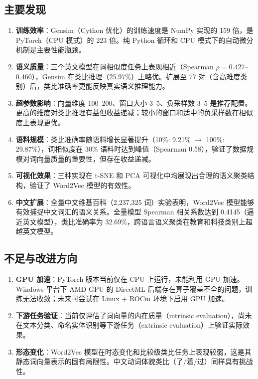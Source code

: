\subsection{主要发现}

\begin{enumerate}
  \item \textbf{训练效率}：Gensim（Cython 优化）的训练速度是 NumPy 实现的 159 倍，是 PyTorch（CPU 模式）的 223 倍。纯 Python 循环和 CPU 模式下的自动微分机制是主要性能瓶颈。
  \item \textbf{语义质量}：三个英文模型在词相似度任务上表现相近（Spearman $\rho = 0.427$--$0.460$），Gensim 在类比推理（25.97\%）上略优。扩展至 77 对（含高难度类别）后，类比准确率更能反映真实语义推理能力。
  \item \textbf{超参数影响}：向量维度 100--200、窗口大小 3--5、负采样数 3--5 是推荐配置。更高的维度对类比推理有益但收益递减；较小的窗口和适中的负采样数在相似度上表现更优。
  \item \textbf{语料规模}：类比准确率随语料增长显著提升（10\%: 9.21\% $\to$ 100\%: 29.87\%），词相似度在 30\% 语料时达到峰值（Spearman 0.58），验证了数据规模对词向量质量的重要性，但存在收益递减。
  \item \textbf{可视化效果}：三种实现在 t-SNE 和 PCA 可视化中均展现出合理的语义聚类结构，验证了 Word2Vec 模型的有效性。
  \item \textbf{中文扩展}：全量中文维基百科（2,237,325 词）实验表明，Word2Vec 模型能够有效捕捉中文词汇的语义关系。全量模型 Spearman 相关系数达到 0.4145（逼近英文模型），类比准确率为 32.69\%，跨语言语义聚类在教育和科技类别上超越英文模型。
\end{enumerate}

\subsection{不足与改进方向}

\begin{enumerate}
  \item \textbf{GPU 加速}：PyTorch 版本当前仅在 CPU 上运行，未能利用 GPU 加速。Windows 平台下 AMD GPU 的 DirectML 后端存在算子覆盖不全的问题，训练无法收敛；未来可尝试在 Linux + ROCm 环境下启用 GPU 加速。
  \item \textbf{下游任务验证}：当前仅评估了词向量的内在质量（intrinsic evaluation），尚未在文本分类、命名实体识别等下游任务（extrinsic evaluation）上验证实际效果。
  \item \textbf{形态变化}：Word2Vec 模型在时态变化和比较级类比任务上表现较弱，这是其静态词向量表示的固有局限性。中文动词体貌类比（了/着/过）同样具有挑战性。
\end{enumerate}
